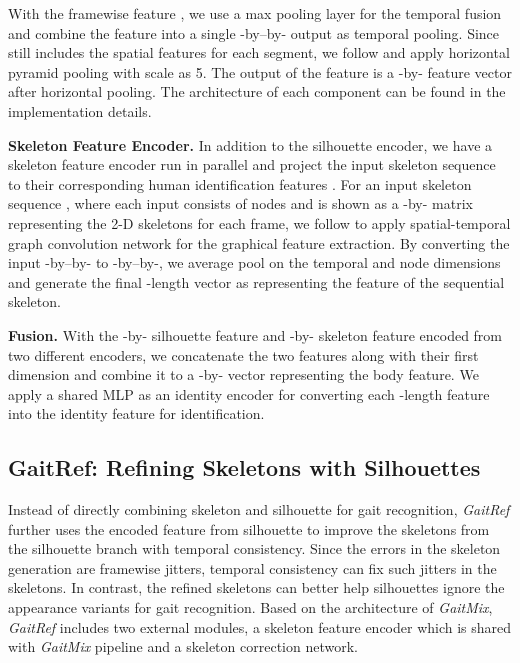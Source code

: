 \documentclass[10pt,twocolumn,letterpaper]{article}
\begin{document}
With the framewise feature , we use a max pooling layer for the temporal fusion and combine the feature into a single -by--by- output as temporal pooling. Since  still includes the spatial features for each segment, we follow \cite{chao2019gaitset,fu2019horizontal} and apply horizontal pyramid pooling with scale  as 5. The output of the feature is a -by- feature vector after horizontal pooling. The architecture of each component can be found in the implementation details. 

\textbf{Skeleton Feature Encoder.} In addition to the silhouette encoder, we have a skeleton feature encoder run in parallel and project the input skeleton sequence  to their corresponding human identification features . For an input skeleton sequence , where each input consists of  nodes and is shown as a -by- matrix representing the 2-D skeletons for each frame, we follow \cite{yan2018spatial} to apply spatial-temporal graph convolution network for the graphical feature extraction. By converting the input -by--by- to -by--by-, we average pool on the temporal and node dimensions and generate the final -length vector as  representing the feature of the sequential skeleton. 


\textbf{Fusion.} With the -by- silhouette feature  and -by- skeleton feature  encoded from two different encoders, we concatenate the two features along with their first dimension and combine it to a -by- vector representing the body feature. We apply a shared MLP as an identity encoder for converting each -length feature into the identity feature for identification.  

\subsection{GaitRef: Refining Skeletons with Silhouettes}\label{sec:gaitref}
Instead of directly combining skeleton and silhouette for gait recognition, \textit{GaitRef} further uses the encoded feature from silhouette to improve the skeletons from the silhouette branch with temporal consistency. Since the errors in the skeleton generation are framewise jitters, temporal consistency can fix such jitters in the skeletons. In contrast, the refined skeletons can better help silhouettes ignore the appearance variants for gait recognition. Based on the architecture of \textit{GaitMix}, \textit{GaitRef} includes two external modules, a skeleton feature encoder which is shared with \textit{GaitMix} pipeline and a skeleton correction network.
\end{document}
